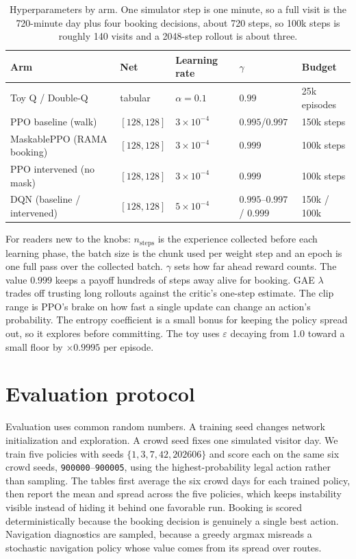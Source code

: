 \documentclass[11pt]{article}
\newcommand{\code}[1]{\texttt{\small #1}}
\begin{document}
\begin{table}[h]
\centering
\small
\caption{Hyperparameters by arm. One simulator step is one minute, so a full visit is the 720-minute
day plus four booking decisions, about 720 steps, so 100k steps is roughly 140 visits and a 2048-step
rollout is about three.}
\label{tab:hparams}
\begin{tabular}{lllll}
\toprule
Arm & Net & Learning rate & $\gamma$ & Budget \\
\midrule
Toy Q / Double-Q & tabular & $\alpha=0.1$ & $0.99$ & 25k episodes \\
PPO baseline (walk) & $[128,128]$ & $3\times10^{-4}$ & $0.995$/$0.997$ & 150k steps \\
MaskablePPO (RAMA booking) & $[128,128]$ & $3\times10^{-4}$ & $0.999$ & 100k steps \\
PPO intervened (no mask) & $[128,128]$ & $3\times10^{-4}$ & $0.999$ & 100k steps \\
DQN (baseline / intervened) & $[128,128]$ & $5\times10^{-4}$ & $0.995$--$0.997$ / $0.999$ & 150k / 100k \\
\bottomrule
\end{tabular}
\end{table}

For readers new to the knobs: $n_{\text{steps}}$ is the experience collected before each learning
phase, the batch size is the chunk used per weight step and an epoch is one full pass over the collected
batch. $\gamma$ sets how far ahead reward counts. The value $0.999$ keeps a payoff hundreds of steps
away alive for booking. GAE $\lambda$ trades off trusting long rollouts against the critic's one-step
estimate. The clip range is PPO's brake on how fast a single update can change an action's probability.
The entropy coefficient is a small bonus for keeping the policy spread out, so it explores before
committing. The toy uses $\varepsilon$ decaying from 1.0 toward a small floor by $\times0.9995$ per
episode.

\section{Evaluation protocol}
\label{app:eval}

Evaluation uses common random numbers. A training seed changes network initialization and exploration.
A crowd seed fixes one simulated visitor day. We train five policies with seeds $\{1,3,7,42,202606\}$
and score each on the same six crowd seeds, \code{900000}--\code{900005}, using the highest-probability
legal action rather than sampling. The tables first average the six crowd days for each trained policy,
then report the mean and spread across the five policies, which keeps instability visible instead of
hiding it behind one favorable run. Booking is scored deterministically because the booking decision is
genuinely a single best action. Navigation diagnostics are sampled, because a greedy argmax misreads a
stochastic navigation policy whose value comes from its spread over routes.
\end{document}
